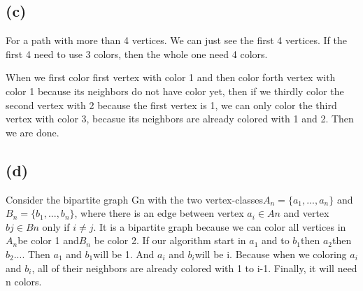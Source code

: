 \documentclass[11pt]{article}
\begin{document}
\subsection*{(c)}
For a path with more than 4 vertices. We can just see the first 4 vertices. If the first 4 need to use 3 colors, then the whole one need 4 colors. 

When we first color first vertex with color 1 and then color forth vertex with color 1 because its neighbors do not have color yet, then if we thirdly color the second vertex with 2 because the first vertex is 1, we can only color the third vertex with color 3, becasue its neighbors are already colored with 1 and 2. Then we are done.

\subsection*{(d)}
Consider the bipartite graph Gn with the two vertex-classes$ A_n = \{a_1, . . . , a_n\}$ and $B_n = \{b_1, . . . , b_n\}$, where there is an
edge between vertex $a_i \in An$ and vertex $bj \in Bn$ only if $ i \neq  j$. It is a bipartite graph because we can color all vertices in $A_n $be color 1 and$ B_n$ be color 2. If our algorithm start in $a_1$ and to $b_1 $then $a_2 $then $b_2 ...$. Then $a_1$ and $b_1 $will be 1. And $a_i$ and $b_i $will be i. Because when we coloring $a_i$ and $b_i $, all of their neighbors are already colored with 1 to i-1. Finally, it will need n colors. 
\end{document}
